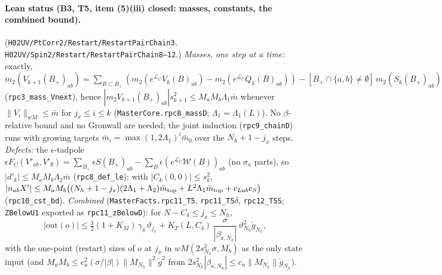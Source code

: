 \documentclass[11pt]{amsart}
\theoremstyle{definition}
\theoremstyle{remark}
\numberwithin{equation}{section}
\begin{document}
\paragraph{Lean status (B3, T5, item (5)(iii) closed: masses, constants, the combined bound).}
(\texttt{H02UV/PtCorr2/Restart/RestartPairChain3}, \texttt{H02UV/Spin2/Restart/RestartPairChain8--12}.) \emph{Masses, one step at a time:}
exactly, $m_2(V_{k+1}(B_+)_{ab})=\sum_{B\subset B_+}(m_2(e^{\mathcal L_C}V_k(B)_{ab})-m_2(e^{\mathcal L_C}Q_k(B)_{ab}))
-[B_+\cap\{a,b\}\neq\emptyset]\,m_2(S_k(B_+)_{ab})$ (\texttt{rpc3\_mass\_Vnext}), hence
$|m_2V_{k+1}(B_+)_{ab}|s_{k+1}^2\le M_aM_b\Lambda_1\bar m$ whenever $\|V_i\|_{wM}\le\bar m$ for $j_x\le i\le k$
(\texttt{MasterCore.rpc8\_massD}; $\Lambda_1=\Lambda_1(L)$). No $\beta$-relative bound and no Gronwall are needed; the
joint induction (\texttt{rpc9\_chainD}) runs with growing targets $\bar m_i=\max(1,2\Lambda_1)^i\bar m_0$ over the
$N_h+1-j_x$ steps. \emph{Defects:} the $\epsilon$-tadpole $\epsilon F_C(V'_{ab},V'_\emptyset)=\sum_{B_+}\epsilon S(B_+)_{ab}
-\sum_B\epsilon(e^{\mathcal L_C}\mathcal W(B))_{ab}$ (no $\sigma_a$ parts), so $|d'_k|\le M_aM_b\Lambda_2\bar m$
(\texttt{rpc8\_def\_le}); with $|C_k(0,0)|\le s_k^2$, $|n_{ab}X'|\le M_aM_b\bigl((N_h+1-j_x)(2\Lambda_1+\Lambda_2)\bar m_{\rm top}
+L^2\Lambda_1\bar m_{\rm top}+c_{Lab}c_S\bigr)$ (\texttt{rpc10\_cst\_bd}). \emph{Combined}
(\texttt{MasterFacts.rpc11\_T5}, \texttt{rpc11\_T5$\delta$}, \texttt{rpc12\_T5S}; \texttt{ZBelowU1} exported as
\texttt{rpc11\_zBelowD}): for $N-C_\delta\le j_x\le N_h$,
\[
|\mathrm{out}(o)|\le\tfrac32(1+K_M)\,\gamma_\delta\,\vartheta_{j_x}+K_T(L,C_\delta)\,\frac{\sigma}{|\beta_{a,N_h}|}\,
\vartheta_{N_h}^2\check g_{N_h},
\]
with the one-point (restart) sizes of $o$ at $j_x$ in $wM(2s_{N_h}^2\sigma,M_b)$ as the only state input
(and $M_aM_b\le c_u^2(\sigma/|\beta|)\|M_{N_h}\|^2\check g^2$ from $2s_{N_h}^2|\beta_{a,N_h}|\le c_u\|M_{N_h}\|\check g_{N_h}$).
\end{document}
